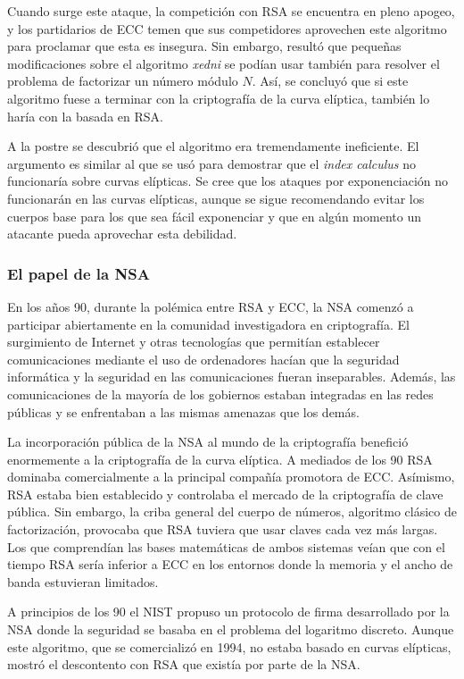 \documentclass[
  a4paper,
  12pt,
  spanish,
]{scrartcl}
\begin{document}
Cuando surge este ataque, la competición con RSA se encuentra en pleno apogeo, y los partidarios de ECC temen que sus competidores aprovechen este algoritmo para proclamar que esta es insegura. Sin embargo, resultó que pequeñas modificaciones sobre el algoritmo \textit{xedni} se podían usar también para resolver el problema de factorizar un número módulo $N$. Así, se concluyó que si este algoritmo fuese a terminar con la criptografía de la curva elíptica, también lo haría con la basada en RSA.

A la postre se descubrió que el algoritmo era tremendamente ineficiente. El argumento es similar al que se usó para demostrar que el \textit{index calculus} no funcionaría sobre curvas elípticas. Se cree que los ataques por exponenciación no funcionarán en las curvas elípticas, aunque se sigue recomendando evitar los cuerpos base para los que sea fácil exponenciar y que en algún momento un atacante pueda aprovechar esta debilidad.

\subsubsection{El papel de la NSA}
En los años 90, durante la polémica entre RSA y ECC, la NSA comenzó a participar abiertamente en la comunidad investigadora en criptografía. El surgimiento de Internet y otras tecnologías que permitían establecer comunicaciones mediante el uso de ordenadores hacían que la seguridad informática y la seguridad en las comunicaciones fueran inseparables. Además, las comunicaciones de la mayoría de los gobiernos estaban integradas en las redes públicas y se enfrentaban a las mismas amenazas que los demás.

La incorporación pública de la NSA al mundo de la criptografía benefició enormemente a la criptografía de la curva elíptica. A mediados de los 90 RSA dominaba comercialmente a la principal compañía promotora de ECC. Asímismo, RSA estaba bien establecido y controlaba el mercado de la criptografía de clave pública. Sin embargo, la criba general del cuerpo de números, algoritmo clásico de factorización, provocaba que RSA tuviera que usar claves cada vez más largas. Los que comprendían las bases matemáticas de ambos sistemas veían que con el tiempo RSA sería inferior a ECC en los entornos donde la memoria y el ancho de banda estuvieran limitados.

A principios de los 90 el NIST propuso un protocolo de firma desarrollado por la NSA donde la seguridad se basaba en el problema del logaritmo discreto. Aunque este algoritmo, que se comercializó en 1994, no estaba basado en curvas elípticas, mostró el descontento con RSA que existía por parte de la NSA.
\end{document}
